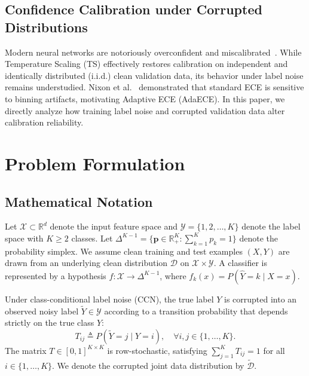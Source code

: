 \documentclass[10pt,twocolumn]{article}
\theoremstyle{definition}
\begin{document}
\subsection{Confidence Calibration under Corrupted Distributions}
Modern neural networks are notoriously overconfident and miscalibrated~\cite{guo2017calibration}. While Temperature Scaling (TS) effectively restores calibration on independent and identically distributed (i.i.d.) clean validation data, its behavior under label noise remains understudied. Nixon et al.~\cite{nixon2019measuring} demonstrated that standard ECE is sensitive to binning artifacts, motivating Adaptive ECE (AdaECE). In this paper, we directly analyze how training label noise and corrupted validation data alter calibration reliability.

\section{Problem Formulation}

\subsection{Mathematical Notation}
Let $\mathcal{X} \subset \mathbb{R}^d$ denote the input feature space and $\mathcal{Y} = \{1, 2, \dots, K\}$ denote the label space with $K \ge 2$ classes. Let $\Delta^{K-1} = \{\mathbf{p} \in \mathbb{R}_+^K : \sum_{k=1}^K p_k = 1\}$ denote the probability simplex. We assume clean training and test examples $(X, Y)$ are drawn from an underlying clean distribution $\mathcal{D}$ on $\mathcal{X} \times \mathcal{Y}$. A classifier is represented by a hypothesis $f: \mathcal{X} \to \Delta^{K-1}$, where $f_k(x) = P(\hat{Y} = k \mid X = x)$.

Under class-conditional label noise (CCN), the true label $Y$ is corrupted into an observed noisy label $\tilde{Y} \in \mathcal{Y}$ according to a transition probability that depends strictly on the true class $Y$:
\begin{equation}
T_{ij} \triangleq P(\tilde{Y} = j \mid Y = i), \quad \forall i, j \in \{1, \dots, K\}.
\end{equation}
The matrix $T \in [0, 1]^{K \times K}$ is row-stochastic, satisfying $\sum_{j=1}^K T_{ij} = 1$ for all $i \in \{1, \dots, K\}$. We denote the corrupted joint data distribution by $\tilde{\mathcal{D}}$.
\end{document}
